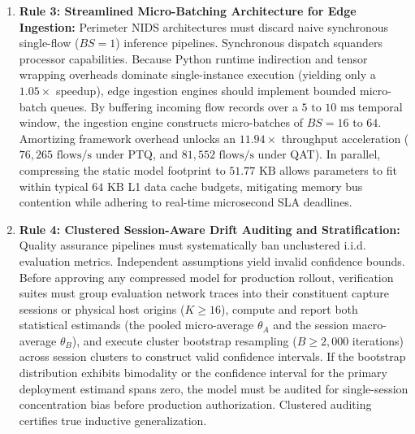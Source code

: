 \documentclass[conference]{IEEEtran}
\begin{document}
\begin{enumerate}
    \item \textbf{Rule 3: Streamlined Micro-Batching Architecture for Edge Ingestion:} Perimeter NIDS architectures must discard naive synchronous single-flow ($BS = 1$) inference pipelines. Synchronous dispatch squanders processor capabilities. Because Python runtime indirection and tensor wrapping overheads dominate single-instance execution (yielding only a $1.05\times$ speedup), edge ingestion engines should implement bounded micro-batch queues. By buffering incoming flow records over a $5\text{ to }10\text{ ms}$ temporal window, the ingestion engine constructs micro-batches of $BS = 16\text{ to }64$. Amortizing framework overhead unlocks an $11.94\times$ throughput acceleration ($76,265\text{ flows/s}$ under PTQ, and $81,552\text{ flows/s}$ under QAT). In parallel, compressing the static model footprint to $51.77\text{ KB}$ allows parameters to fit within typical $64\text{ KB}$ L1 data cache budgets, mitigating memory bus contention while adhering to real-time microsecond SLA deadlines.
    \item \textbf{Rule 4: Clustered Session-Aware Drift Auditing and Stratification:} Quality assurance pipelines must systematically ban unclustered i.i.d. evaluation metrics. Independent assumptions yield invalid confidence bounds. Before approving any compressed model for production rollout, verification suites must group evaluation network traces into their constituent capture sessions or physical host origins ($K \ge 16$), compute and report both statistical estimands (the pooled micro-average $\theta_A$ and the session macro-average $\theta_B$), and execute cluster bootstrap resampling ($B \ge 2,000$ iterations) across session clusters to construct valid confidence intervals. If the bootstrap distribution exhibits bimodality or the confidence interval for the primary deployment estimand spans zero, the model must be audited for single-session concentration bias before production authorization. Clustered auditing certifies true inductive generalization.
\end{enumerate}
\end{document}
